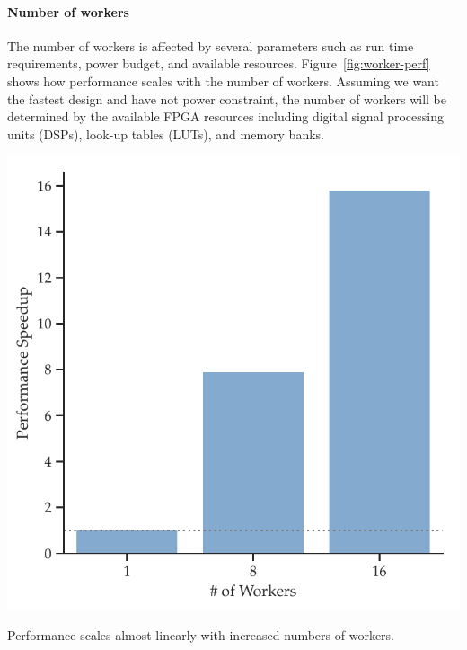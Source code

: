 \paragraph{Number of workers}
The number of workers is affected by several parameters such as run time requirements, power budget, and available resources. Figure~\ref{fig:worker-perf} shows how performance scales with the number of workers. Assuming we want the fastest design and have not power constraint, the number of workers will be determined by the available FPGA resources including digital signal processing units (DSPs), look-up tables (LUTs), and memory banks.

\begin{marginfigure}
\centering
\includegraphics[width=\columnwidth]{hfbs-figs/worker_scaling.pdf}
\caption{Performance scales almost linearly with increased numbers of workers.}
\label{fig:worker-perf}
\end{marginfigure}




